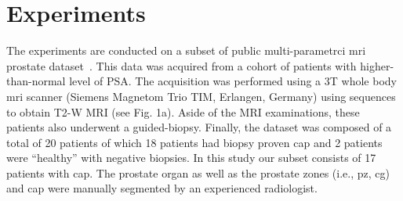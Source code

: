 \section{Experiments}
\label{sec:exp}
The experiments are conducted on a subset of public multi-parametrci \ac{mri} prostate dataset~\cite{lemaitre2015boosting}.
This data was acquired from a cohort of patients with higher-than-normal level of PSA. The acquisition was performed using a 3T whole body \ac{mri} scanner (Siemens Magnetom Trio TIM, Erlangen, Germany) using sequences to obtain T2-W MRI (see Fig. 1a). Aside of the MRI examinations, these patients also underwent a guided-biopsy. Finally, the dataset was composed of a total of 20 patients of which 18 patients had biopsy proven \ac{cap} and 2 patients were ``healthy'' with negative biopsies. In this study our subset consists of 17 patients with \ac{cap}. The prostate organ as well as the prostate zones (i.e., \ac{pz}, \ac{cg}) and \ac{cap} were manually segmented by an experienced radiologist.